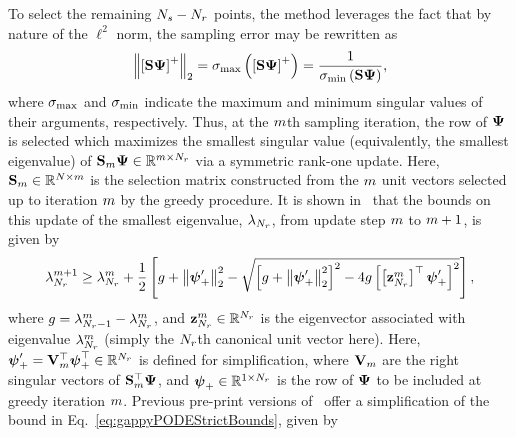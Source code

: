 \begin{enumerate}
	To select the remaining $N_s - N_r$ points, the method leverages the fact that by nature of the $\ell^2$ norm, the sampling error may be rewritten as
	\begin{equation}
		\left\Vert \left[ \sampMat \deimBasis \right]^+ \right\Vert_2 = \singVal_{\text{max}} \left( \left[\sampMat \deimBasis \right]^+ \right) = \frac{1}{\singVal_{\text{min}} \left( \sampMat \deimBasis \right)},
	\end{equation}
	where $\sigma_{\text{max}}$ and $\sigma_{\text{min}}$ indicate the maximum and minimum singular values of their arguments, respectively. Thus, at the $m$th sampling iteration, the row of $\deimBasis$ is selected which maximizes the smallest singular value (equivalently, the smallest eigenvalue) of $\sampMat_{\greedyIdx} \deimBasis \inRTwo{\greedyIdx}{\numResModes}$ via a symmetric rank-one update. Here, $\mathbf{S}_{m} \in \mathbb{R}^{N \times m}$ is the selection matrix constructed from the $m$ unit vectors selected up to iteration $m$ by the greedy procedure. It is shown in~\cite{Peherstorfer2020} that the bounds on this update of the smallest eigenvalue, $\lambda_{N_r}$, from update step $m$ to $m+1$, is given by
	\begin{equation}\label{eq:gappyPODEStrictBounds}
		\lambda_{N_r}^{m+1} \ge \lambda_{N_r}^{m} + \frac{1}{2} \left[ g + \left\Vert \boldsymbol{\psi}'_+ \right\Vert_2^2 - \sqrt{\left[ g + \left\Vert \boldsymbol{\psi}'_+ \right\Vert_2^2 \right]^2 - 4g\left[ \left[\mathbf{z}_{N_r}^{m} \right]^\top \boldsymbol{\psi}'_+ \right]^2} \right],
	\end{equation}
	where $g = \lambda_{N_r-1}^{m} - \lambda_{N_r}^{m}$, and $\mathbf{z}_{N_r}^{m} \in \mathbb{R}^{N_r}$ is the eigenvector associated with eigenvalue $\lambda_{N_r}^{m}$ (simply the $N_r$th canonical unit vector here). Here, $\deimBasisREvecRow = \rightEvecMat_{\greedyIdx}^\top \deimBasisRowUpdate^\top \inROne{\numResModes}$ is defined for simplification, where $\rightEvecMat_{\greedyIdx}$ are the right singular vectors of $\sampMat_{\greedyIdx}^\top \deimBasis$, and $\boldsymbol{\psi}_+ \in \mathbb{R}^{1 \times N_r}$ is the row of $\deimBasis$ to be included at greedy iteration $m$. Previous pre-print versions of~\cite{Peherstorfer2020} offer a simplification of the bound in Eq.~\ref{eq:gappyPODEStrictBounds}, given by

\end{enumerate}
